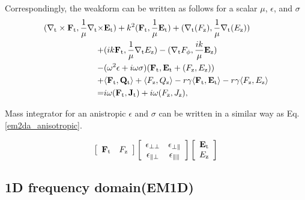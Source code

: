 \documentclass[11pt,a4paper,final]{report}
\begin{document}
Correspondingly, the weakform can be written as follows for a scalar $\mu$, $\epsilon$,  and $\sigma$
\begin{align}
(\nabla_{\rm t} \times \mathbf{F}_{\rm t},  \frac{1}{\mu}\nabla_{\rm t}  \times & \mathbf{E}_{\rm t}) 
+  k^2(\mathbf{F}_{\rm t}, \frac{1}{\mu}\mathbf{E}_{\rm t})
+ (\nabla_{\rm t} (F_{\rm z}), \frac{1}{\mu}\nabla_{\rm t} (E_{\rm z}))
 \notag \\
+& (ik \mathbf{F}_{\rm t}, \frac{1}{\mu}\nabla_{\rm t} E_{\rm z})
- (\nabla_{\rm t} F_{\rm \phi}, \frac{ik}{\mu} \mathbf{E}_{\rm z})
 \notag \\
 -& (\omega^2 \epsilon+ i \omega \sigma) (  \mathbf{F}_{\rm t}, \mathbf{E}_{\rm t} + (F_{\rm z}, E_{\rm z})) 
 \notag \\
 +& \langle \mathbf{F}_{\rm t},  \mathbf{Q}_{\rm t} \rangle + \langle F_{\rm z}, Q_{\rm z} \rangle 
 -r \gamma \langle \mathbf{F}_{\rm t}, \mathbf{E}_{\rm t} \rangle
 -r \gamma \langle F_{\rm z}, E_{\rm z} \rangle
 \notag \\
 =& i \omega ( \mathbf{F}_{\rm t}, \mathbf{J}_{\rm t} ) + i \omega ( F_{\rm z}, J_{\rm z} ), \label{em2d_weak}
 \end{align}

Mass integrator for an anistropic $\epsilon$ and $\sigma$ can be written in a similar way as Eq.\,\ref{em2da_anisotropic}. 

 \begin{equation}
 \left[ {\begin{array}{*{20}c}
\mathbf{F}_{\rm t}  & F_{\rm z}\\
\end{array}}\right]
\left[ {\begin{array}{*{20}c}
\mathbf{\epsilon}_{\perp \perp}  & \mathbf{\epsilon}_{\perp \parallel}\\
\mathbf{\epsilon}_{\parallel \perp} & \mathbf{\epsilon}_{\parallel \parallel}\\
\end{array}}\right]
 \left[ {\begin{array}{*{20}c}
\mathbf{E}_{\rm t}  \\
E_{\rm z}\\
\end{array}}\right]
\label{em2d_anisotropic}
\end{equation}


\subsection{1D frequency domain(EM1D)}
\end{document}
